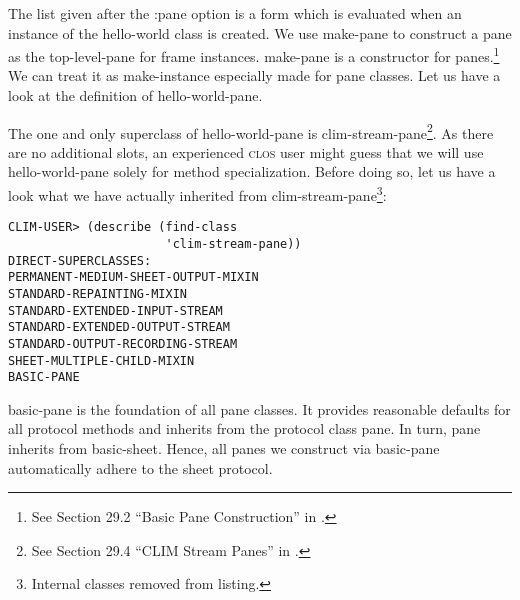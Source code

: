 \documentclass[twocolumn,a4paper]{article}
\newcommand {\concept} [1] {{\sl #1}\index{#1}}
\newcommand {\code}[1]{{\sffamily #1}}
\newcommand {\CLOS}{\textsc{clos}}
\let\class\code
\let\method\code
\let\keyword\code
\begin{document}
The list given after the \keyword{:pane} option is a form which is
evaluated when an instance of the \class{hello-world} class is
created. We use \method{make-pane} to construct a pane as the
top-level-pane for frame instances. \method{make-pane} is a
constructor for panes.\footnote{See Section 29.2 ``Basic Pane
  Construction'' in \cite{clim-spec}.} We can treat it as
\code{make-instance} especially made for pane classes.  Let us have a
look at the definition of \class{hello-world-pane}.

\lstset{style=inlinestyle}  

The one and only superclass of \class{hello-world-pane} is
\class{clim-stream-pane}\footnote{See Section 29.4 ``CLIM Stream
  Panes'' in \cite{clim-spec}.}. As there are no additional slots, an
experienced \CLOS{} user might guess that we will use
\class{hello-world-pane} solely for method specialization.  Before doing so,
let us have a look what we have actually
inherited from \class{clim-stream-pane}\footnote{Internal classes
  removed from listing.}:

\lstset{style=inlinestyle}
\begin{lstlisting}
CLIM-USER> (describe (find-class 
                      'clim-stream-pane))
DIRECT-SUPERCLASSES: 
PERMANENT-MEDIUM-SHEET-OUTPUT-MIXIN
STANDARD-REPAINTING-MIXIN
STANDARD-EXTENDED-INPUT-STREAM
STANDARD-EXTENDED-OUTPUT-STREAM
STANDARD-OUTPUT-RECORDING-STREAM
SHEET-MULTIPLE-CHILD-MIXIN
BASIC-PANE
\end{lstlisting}

\class{basic-pane} is the foundation of all pane classes. It provides
reasonable defaults for all protocol methods and inherits from the
protocol class \class{pane}. In turn, \class{pane} inherits from
\class{basic-sheet}. Hence, all panes we construct via
\class{basic-pane} automatically adhere to the sheet protocol.


\end{document}
